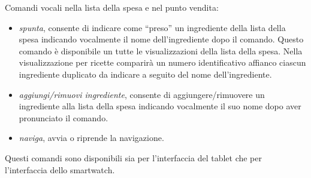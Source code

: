 \begin{itemize}
\begin{figure}[H]
\end{figure}
Comandi vocali nella lista della spesa e nel punto vendita:
\begin{itemize}
\item \emph{spunta}, consente di indicare come ``preso'' un ingrediente
della lista della spesa indicando vocalmente il nome dell'ingrediente
dopo il comando. Questo comando è disponibile un tutte le
visualizzazioni della lista della spesa. Nella visualizzazione per
ricette comparirà un numero identificativo affianco ciascun ingrediente
duplicato da indicare a seguito del nome dell'ingrediente.
\item \emph{aggiungi/rimuovi ingrediente}, consente di
aggiungere/rimuovere un ingrediente
alla lista della spesa indicando vocalmente il suo nome dopo aver
pronunciato il comando.
\item \emph{naviga}, avvia o riprende la navigazione.
\end{itemize}
Questi comandi sono disponibili sia per l'interfaccia del tablet che per
l'interfaccia dello smartwatch.


\end{itemize}

